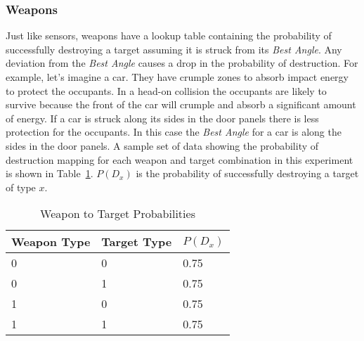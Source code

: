 \subsubsection{Weapons}

Just like sensors, weapons have a lookup table containing the probability of successfully destroying a target assuming it is struck from its \textit{Best Angle}.  Any deviation from the \textit{Best Angle} causes a drop in the probability of destruction.  For example, let's imagine a car.  They have crumple zones to absorb impact energy to protect the occupants.  In a head-on collision the occupants are likely to survive because the front of the car will crumple and absorb a significant amount of energy.  If a car is struck along its sides in the door panels there is less protection for the occupants.  In this case the \textit{Best Angle} for a car is along the sides in the door panels. A sample set of data showing the probability of destruction mapping for each weapon and target combination in this experiment is shown in Table~\ref{tab:wpnTgtProb}.  $P(D_{x})$ is the probability of successfully destroying a target of type $x$.

\begin{table}[H]
	\caption{Weapon to Target Probabilities}
	\centering
	\label{tab:wpnTgtProb}
	\begin{tabular}{|p{1.5cm}|p{1.5cm}|p{3cm}|}
		\hline
		Weapon Type & Target Type & $P(D_{x})$\\ \hline
		0 & 0 & 0.75 \\ \hline
		0 & 1 & 0.75 \\ \hline
		1 & 0 & 0.75 \\ \hline
		1 & 1 & 0.75 \\ \hline
	\end{tabular}
\end{table}



